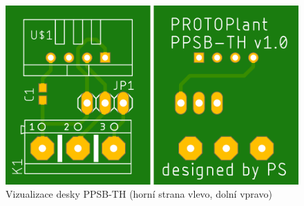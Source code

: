 \begin{figure}[h]
    \centering
    \includegraphics[width=\textwidth]{img/HARDWARE/PPSB-TH_BOTH.png}
    \caption{Vizualizace desky PPSB-TH (horní strana vlevo, dolní vpravo)}
    \label{fig:PPSB-TH_VISUAL}
\end{figure}

